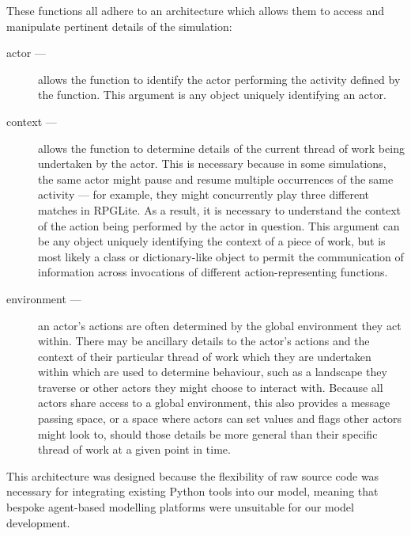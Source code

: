 These functions all adhere to an
architecture which allows them to access and manipulate pertinent details of the
simulation:

\begin{description}
  \item[actor —] allows the function to identify the actor performing the activity
    defined by the function. This argument is any object uniquely identifying an
    actor.
    \item[context —] allows the function to determine details of the current
      thread of work being undertaken by the actor. This is necessary because in
      some simulations, the same actor might pause and resume multiple
      occurrences of the same activity --- for example, they might concurrently
      play three different matches in RPGLite. As a result, it is necessary to
      understand the context of the action being performed by the actor in
      question. This argument can be any object uniquely identifying the context
      of a piece of work, but is most likely a class or dictionary-like object
      to permit the communication of information across invocations of different
      action-representing functions.
      \item[environment —] an actor's actions are often determined by the global
        environment they act within. There may be ancillary details to the
        actor's actions and the context of their particular thread of work which
        they are undertaken within which are used to determine behaviour, such
        as a landscape they traverse or other actors they might choose to
        interact with. Because all actors share access to a global environment,
        this also provides a message passing space, or a space where actors can
        set values and flags other actors might look to, should those details be
        more general than their specific thread of work at a given point in time.
\end{description}

This architecture was designed because the flexibility of raw source code was
necessary for integrating existing Python tools into our model, meaning that
bespoke agent-based modelling platforms were unsuitable for our model
development.
\par

